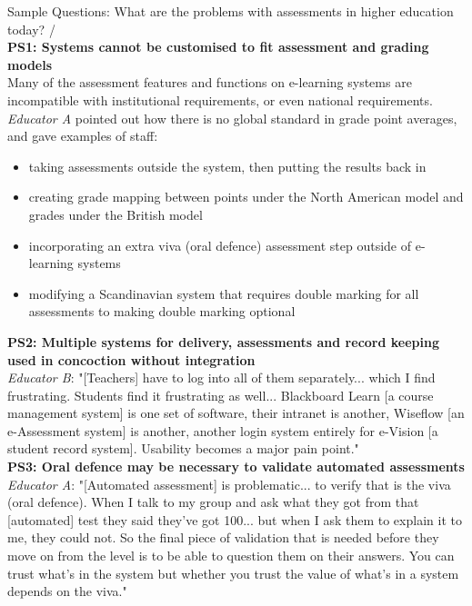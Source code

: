 Sample Questions: What are the problems with assessments in higher education today? / \vspace{0.25cm}\\
\textbf{PS1: Systems cannot be customised to fit assessment and grading models}\\
Many of the assessment features and functions on e-learning systems are incompatible 
with institutional requirements, or even national requirements. \textit{Educator A} pointed out how there is 
no global standard in grade point averages, and gave examples of staff:
\begin{itemize}
    \setlength\itemsep{0em}
    \item taking assessments outside the system, then putting the results back in
    \item creating grade mapping between points under the North American model and 
    grades under the British model
    \item incorporating an extra viva (oral defence) assessment step outside of e-learning systems
    \item modifying a Scandinavian system that requires double marking for all assessments 
    to making double marking optional
\end{itemize}
\textbf{PS2: Multiple systems for delivery, assessments and record keeping used in concoction without integration}\\
\textit{Educator B}: "[Teachers] have to log into all of them separately... which I find frustrating. Students 
find it frustrating as well... Blackboard Learn [a course management system] is one set of software, 
their intranet is another, Wiseflow [an e-Assessment system] is another, another login system entirely 
for e-Vision [a student record system]. Usability becomes a major pain point."\vspace{0.25cm}\\
\textbf{PS3: Oral defence may be necessary to validate automated assessments}\\
\textit{Educator A}: "[Automated assessment] is problematic... to verify that is the viva (oral defence).
When I talk to my group and ask what they got from that [automated] test they said they've got 100... 
but when I ask them to explain it to me, they could not. So the final piece of validation that is needed
before they move on from the level is to be able to question them on their answers. You can trust 
what's in the system but whether you trust the value of what's in a system depends on the viva."\vspace{0.25cm}\\
